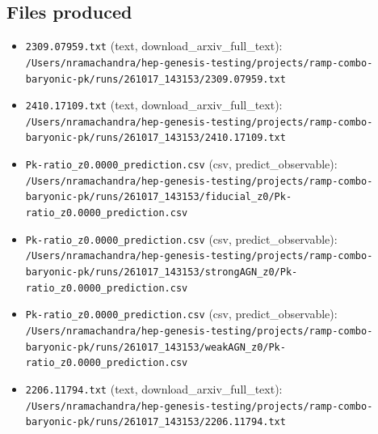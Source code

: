 \documentclass[11pt,a4paper]{article}
\begin{document}
\subsection{Files produced}
\begin{itemize}
  \item \texttt{2309.07959.txt} (text, download\_arxiv\_full\_text): \texttt{/\allowbreak{}Users/\allowbreak{}nramachandra/\allowbreak{}hep-genesis-testing/\allowbreak{}projects/\allowbreak{}ramp-combo-baryonic-pk/\allowbreak{}runs/\allowbreak{}261017\_\allowbreak{}143153/\allowbreak{}2309.07959.txt}
  \item \texttt{2410.17109.txt} (text, download\_arxiv\_full\_text): \texttt{/\allowbreak{}Users/\allowbreak{}nramachandra/\allowbreak{}hep-genesis-testing/\allowbreak{}projects/\allowbreak{}ramp-combo-baryonic-pk/\allowbreak{}runs/\allowbreak{}261017\_\allowbreak{}143153/\allowbreak{}2410.17109.txt}
  \item \texttt{Pk-ratio\_\allowbreak{}z0.0000\_\allowbreak{}prediction.csv} (csv, predict\_observable): \texttt{/\allowbreak{}Users/\allowbreak{}nramachandra/\allowbreak{}hep-genesis-testing/\allowbreak{}projects/\allowbreak{}ramp-combo-baryonic-pk/\allowbreak{}runs/\allowbreak{}261017\_\allowbreak{}143153/\allowbreak{}fiducial\_\allowbreak{}z0/\allowbreak{}Pk-ratio\_\allowbreak{}z0.0000\_\allowbreak{}prediction.csv}
  \item \texttt{Pk-ratio\_\allowbreak{}z0.0000\_\allowbreak{}prediction.csv} (csv, predict\_observable): \texttt{/\allowbreak{}Users/\allowbreak{}nramachandra/\allowbreak{}hep-genesis-testing/\allowbreak{}projects/\allowbreak{}ramp-combo-baryonic-pk/\allowbreak{}runs/\allowbreak{}261017\_\allowbreak{}143153/\allowbreak{}strongAGN\_\allowbreak{}z0/\allowbreak{}Pk-ratio\_\allowbreak{}z0.0000\_\allowbreak{}prediction.csv}
  \item \texttt{Pk-ratio\_\allowbreak{}z0.0000\_\allowbreak{}prediction.csv} (csv, predict\_observable): \texttt{/\allowbreak{}Users/\allowbreak{}nramachandra/\allowbreak{}hep-genesis-testing/\allowbreak{}projects/\allowbreak{}ramp-combo-baryonic-pk/\allowbreak{}runs/\allowbreak{}261017\_\allowbreak{}143153/\allowbreak{}weakAGN\_\allowbreak{}z0/\allowbreak{}Pk-ratio\_\allowbreak{}z0.0000\_\allowbreak{}prediction.csv}
  \item \texttt{2206.11794.txt} (text, download\_arxiv\_full\_text): \texttt{/\allowbreak{}Users/\allowbreak{}nramachandra/\allowbreak{}hep-genesis-testing/\allowbreak{}projects/\allowbreak{}ramp-combo-baryonic-pk/\allowbreak{}runs/\allowbreak{}261017\_\allowbreak{}143153/\allowbreak{}2206.11794.txt}

\end{itemize}
\end{document}

